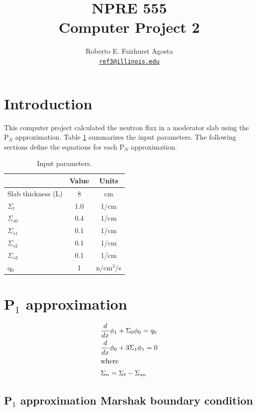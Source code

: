\documentclass[letterpaper]{article}
\author{Roberto E. Fairhurst Agosta
        \\ \href{mailto:ref3@illinois.edu}{\texttt{ref3@illinois.edu}}
}
\title{NPRE 555\\ Computer Project 2}
\begin{document}
\begin{titlepage}
\maketitle
\thispagestyle{empty}
\end{titlepage}

\section{Introduction}

This computer project calculated the neutron flux in a moderator slab using the P$_N$ approximation.
Table \ref{tab:parameters} summarizes the input parameters.
The following sections define the equations for each P$_N$ approximation.

\begin{table}[htbp!]
  \centering
  \caption{Input parameters.}
  \begin{tabular}{lcc}
  \toprule
                 & Value & Units   \\
  \midrule
  Slab thickness (L) & 8     & cm  \\
  $\Sigma_t$     & 1.0   & 1/cm    \\
  $\Sigma_{s0}$  & 0.4   & 1/cm    \\
  $\Sigma_{s1}$  & 0.1   & 1/cm    \\
  $\Sigma_{s2}$  & 0.1   & 1/cm    \\
  $\Sigma_{s3}$  & 0.1   & 1/cm    \\
  q$_0$          & 1     & n/cm$^{3}$/s \\
  \bottomrule
  \end{tabular}
  \label{tab:parameters}
\end{table}

\section{P$_1$ approximation}

\begin{align}
    & \frac{d}{dx}\phi_1 + \Sigma_0 \phi_0 = q_0  \label{eq:P1-0} \\
    & \frac{d}{dx}\phi_0 + 3 \Sigma_1 \phi_1 = 0  \label{eq:P1-1} \\
    \intertext{where}
    & \Sigma_n = \Sigma_t - \Sigma_{sn} \notag
\end{align}

\subsection{P$_1$ approximation Marshak boundary condition}
\label{sec:p1-marshak}
\end{document}
